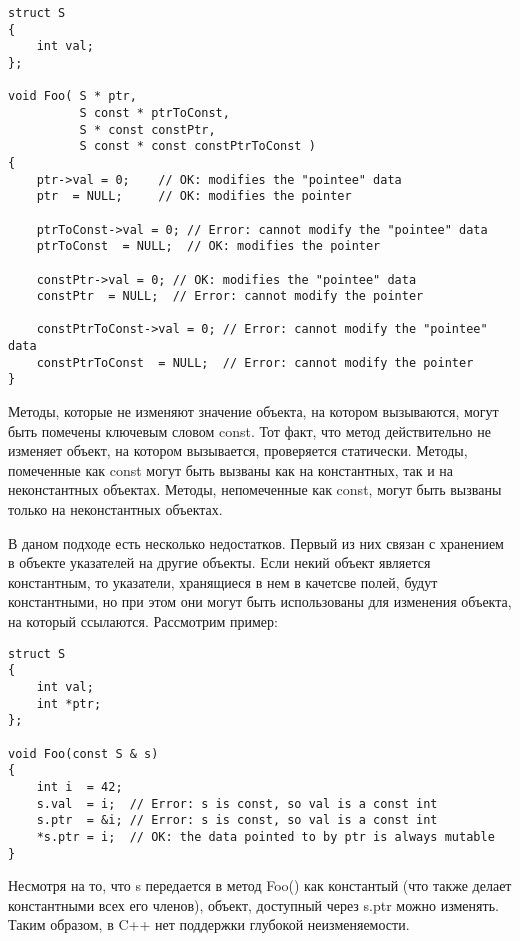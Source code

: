 \begin{lstlisting}[caption=Константный указатель, label=code:const_pointer]
struct S
{ 
    int val;
};

void Foo( S * ptr,
          S const * ptrToConst,
          S * const constPtr,
          S const * const constPtrToConst )
{
    ptr->val = 0;    // OK: modifies the "pointee" data
    ptr  = NULL;     // OK: modifies the pointer
 
    ptrToConst->val = 0; // Error: cannot modify the "pointee" data
    ptrToConst  = NULL;  // OK: modifies the pointer
 
    constPtr->val = 0; // OK: modifies the "pointee" data
    constPtr  = NULL;  // Error: cannot modify the pointer
 
    constPtrToConst->val = 0; // Error: cannot modify the "pointee" data
    constPtrToConst  = NULL;  // Error: cannot modify the pointer
}
\end{lstlisting}

Методы, которые не изменяют значение объекта, на котором вызываются, могут быть помечены ключевым словом const. Тот факт, что метод действительно не изменяет объект, на котором вызывается, проверяется статически. Методы, помеченные как const могут быть вызваны как на константных, так и на неконстантных объектах. Методы, непомеченные как const, могут быть вызваны только на неконстантных объектах. 

В даном подходе есть несколько недостатков. Первый из них связан с хранением в объекте указателей на другие объекты. Если некий объект является константным, то указатели, хранящиеся в нем в качетсве полей, будут константными, но при этом они могут быть использованы для изменения объекта, на который ссылаются. Рассмотрим пример: 

\begin{lstlisting}[caption=Пример изменения значения по указателю в константном методе, label=code:pointer]
struct S
{ 
    int val;
    int *ptr;
};
 
void Foo(const S & s)
{
    int i  = 42;
    s.val  = i;  // Error: s is const, so val is a const int
    s.ptr  = &i; // Error: s is const, so val is a const int
    *s.ptr = i;  // OK: the data pointed to by ptr is always mutable
}
\end{lstlisting}

Несмотря на то, что s передается в метод Foo() как константый (что также делает константными всех его членов), объект, доступный через s.ptr можно изменять. Таким образом, в C++ нет поддержки глубокой неизменяемости.

